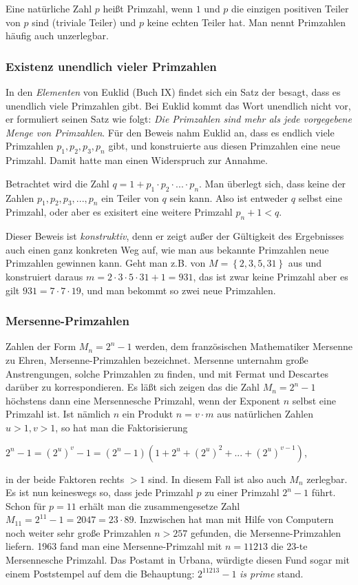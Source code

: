 \documentclass[a4paper,11pt]{article}
\begin{document}
Eine natürliche Zahl $p$ heißt Primzahl, wenn $1$ und $p$ die einzigen
positiven Teiler von $p$ sind (triviale Teiler) und $p$ keine echten Teiler
hat. Man nennt Primzahlen häufig auch unzerlegbar.

\subsubsection*{Existenz unendlich vieler Primzahlen}
In den \textit{Elementen} von Euklid (Buch IX) findet sich ein Satz der besagt,
dass es unendlich viele Primzahlen gibt. Bei Euklid kommt das Wort
unendlich nicht vor, er formuliert seinen Satz wie folgt: \textit{Die
Primzahlen sind mehr als jede vorgegebene Menge von Primzahlen}. Für den Beweis
nahm Euklid an, dass es endlich viele Primzahlen $p_1, p_2, p_3 , p_n$ gibt,
und konstruierte aus diesen Primzahlen eine neue Primzahl.
Damit hatte man einen Widerspruch zur Annahme.

Betrachtet wird die Zahl $q = 1 + p_1 \cdot p_2 \cdot ... \cdot p_n $. Man
überlegt sich, dass keine der Zahlen $p_1, p_2, p_3, ... , p_n$ ein Teiler von
$q$ sein kann.
Also ist entweder $q$ selbst eine Primzahl, oder aber es exisitert eine weitere
Primzahl $p_n+1 < q$.

Dieser Beweis ist \textit{konstruktiv}, denn er zeigt außer der Gültigkeit des
Ergebnisses auch einen ganz konkreten Weg auf, wie man aus bekannte Primzahlen
neue Primzahlen gewinnen kann. Geht man z.B. von
$M = \left\lbrace 2, 3, 5, 31 \right\rbrace $ aus und konstruiert daraus
$ m = 2 \cdot 3 \cdot 5 \cdot 31 + 1 = 931$, das ist zwar keine Primzahl aber es
gilt $931 = 7 \cdot 7 \cdot 19$, und man bekommt so zwei neue Primzahlen.

\subsubsection*{Mersenne-Primzahlen}
Zahlen der Form $M_n = 2^n - 1 $ werden, dem französischen Mathematiker Mersenne
zu Ehren, Mersenne-Primzahlen bezeichnet. Mersenne unternahm große
Anstrengungen, solche Primzahlen zu finden, und mit Fermat und Descartes
darüber zu korrespondieren. Es läßt sich zeigen das die Zahl $M_n = 2^n -1 $
höchstens dann eine Mersennesche Primzahl, wenn der Exponent $n$ selbst eine
Primzahl ist. Ist nämlich $n$ ein Produkt $n = v\cdot m$ aus natürlichen Zahlen
$u>1, v>1$,  so hat man die Faktorisierung
\begin{center}
{$2^n -1 = (2^u)^v - 1 = (2^n-1)(1+2^u+(2^u)^2+...+(2^u)^{v-1})$},
\end{center}
in der beide Faktoren rechts $>1$ sind. In diesem Fall ist also auch $M_n$
zerlegbar. Es ist nun keineswegs so, dass jede Primzahl $p$ zu einer
Primzahl $2^n-1$ führt. Schon für $p = 11$ erhält man die zusammengesetze
Zahl $M_{11} = 2^{11} - 1 = 2047 = 23 \cdot 89$. Inzwischen hat man mit Hilfe von
Computern noch weiter sehr große Primzahlen $n>257$ gefunden, die
Mersenne-Primzahlen liefern. 1963 fand man eine Mersenne-Primzahl mit
$n = 11213$ die 23-te Mersennesche Primzahl. Das Postamt in Urbana,
würdigte diesen Fund sogar mit einem Poststempel auf dem die Behauptung:
$2^{11213}-1$ \textit{is prime} stand.
\end{document}
